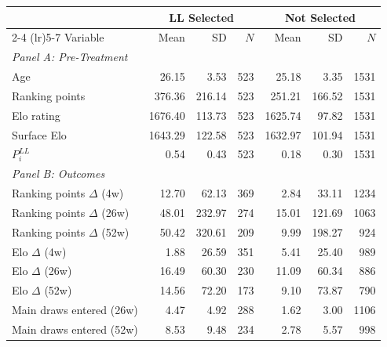 \begin{tabular}{p{4cm} rrr rrr}
\toprule
 & \multicolumn{3}{c}{LL Selected} & \multicolumn{3}{c}{Not Selected} \\
\cmidrule(lr){2-4} \cmidrule(lr){5-7}
Variable & Mean & SD & $N$ & Mean & SD & $N$ \\
\midrule
\multicolumn{7}{l}{\textit{Panel A: Pre-Treatment}} \\
\quad Age & 26.15 & 3.53 & 523 & 25.18 & 3.35 & 1531 \\
\quad Ranking points & 376.36 & 216.14 & 523 & 251.21 & 166.52 & 1531 \\
\quad Elo rating & 1676.40 & 113.73 & 523 & 1625.74 & 97.82 & 1531 \\
\quad Surface Elo & 1643.29 & 122.58 & 523 & 1632.97 & 101.94 & 1531 \\
\quad $P_i^{LL}$ & 0.54 & 0.43 & 523 & 0.18 & 0.30 & 1531 \\
\midrule
\multicolumn{7}{l}{\textit{Panel B: Outcomes}} \\
\quad Ranking points $\Delta$ (4w) & 12.70 & 62.13 & 369 & 2.84 & 33.11 & 1234 \\
\quad Ranking points $\Delta$ (26w) & 48.01 & 232.97 & 274 & 15.01 & 121.69 & 1063 \\
\quad Ranking points $\Delta$ (52w) & 50.42 & 320.61 & 209 & 9.99 & 198.27 & 924 \\
\quad Elo $\Delta$ (4w) & 1.88 & 26.59 & 351 & 5.41 & 25.40 & 989 \\
\quad Elo $\Delta$ (26w) & 16.49 & 60.30 & 230 & 11.09 & 60.34 & 886 \\
\quad Elo $\Delta$ (52w) & 14.56 & 72.20 & 173 & 9.10 & 73.87 & 790 \\
\quad Main draws entered (26w) & 4.47 & 4.92 & 288 & 1.62 & 3.00 & 1106 \\
\quad Main draws entered (52w) & 8.53 & 9.48 & 234 & 2.78 & 5.57 & 998 \\
\bottomrule
\end{tabular}
